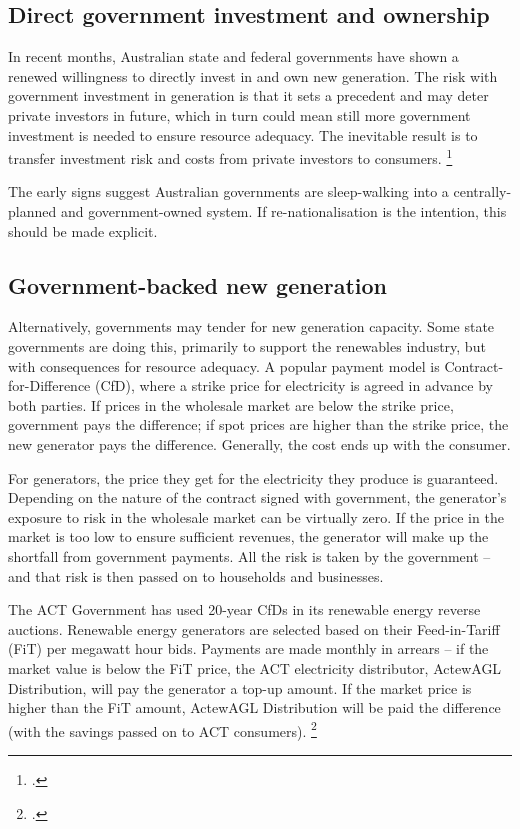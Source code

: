 \documentclass[FrontPage]{grattan}
\begin{document}
\subsection{Direct government investment and ownership}\label{subsec:direct-government-investment}
In recent months, Australian state and federal governments have shown a renewed willingness to directly invest in and own new generation. The risk with government investment in generation is that it sets a precedent and may deter private investors in future, which in turn could mean still more government investment is needed to ensure resource adequacy. The inevitable result is to transfer investment risk and costs from private investors to consumers.%
\footcite{WoodBlowers-2017-Powering-Through}

The early signs suggest Australian governments are sleep-walking into a centrally-planned and government-owned system. If re-nationalisation is the intention, this should be made explicit.

\subsection{Government-backed new generation}\label{subsec:government-backed-new-generation}
Alternatively, governments may tender for new generation capacity. Some state governments are doing this, primarily to support the renewables industry, but with consequences for resource adequacy. A popular payment model is Contract-for-Difference (CfD), where a strike price for electricity is agreed in advance by both parties. If prices in the wholesale market are below the strike price, government pays the difference; if spot prices are higher than the strike price, the new generator pays the difference. Generally, the cost ends up with the consumer.

For generators, the price they get for the electricity they produce is guaranteed. Depending on the nature of the contract signed with government, the generator's exposure to risk in the wholesale market can be virtually zero. If the price in the market is too low to ensure sufficient revenues, the generator will make up the shortfall from government payments. All the risk is taken by the government -- and that risk is then passed on to households and businesses.

The ACT Government has used 20-year CfDs in its renewable energy reverse auctions. Renewable energy generators are selected based on their Feed-in-Tariff (FiT) per megawatt hour bids. Payments are made monthly in arrears -- if the market value is below the FiT price, the ACT electricity distributor, ActewAGL Distribution, will pay the generator a top-up amount. If the market price is higher than the FiT amount, ActewAGL Distribution will be paid the difference (with the savings passed on to ACT consumers).%
\footcite{ACTrenewablesauctions2016}
\end{document}
